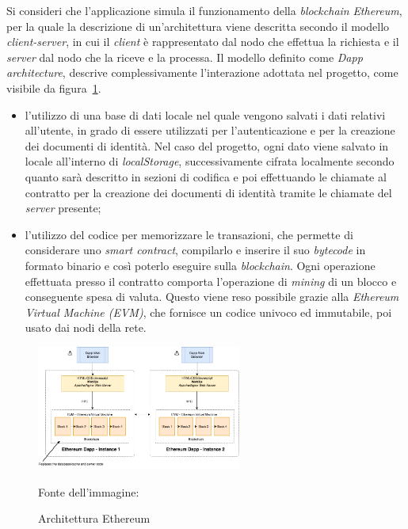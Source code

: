 Si consideri che l'applicazione simula il funzionamento della \textit{blockchain} \textit{Ethereum}, per la quale la descrizione di un'architettura viene
descritta secondo il modello \textit{client-server}, in cui il \textit{client} è rappresentato dal nodo che effettua la richiesta e il \textit{server} dal nodo che la riceve e la processa.
Il modello definito come \textit{Dapp architecture}, descrive complessivamente l'interazione adottata nel progetto, come visibile da figura~\ref{fig:eth-architecture}.
\begin{itemize}
\item l'utilizzo di una base di dati locale nel quale vengono salvati i dati relativi all'utente, in grado di essere utilizzati per l'autenticazione e per la creazione dei documenti di identità.
Nel caso del progetto, ogni dato viene salvato in locale all'interno di \textit{localStorage}, successivamente cifrata localmente secondo quanto sarà descritto in sezioni di codifica e 
poi effettuando le chiamate al contratto per la creazione dei documenti di identità tramite le chiamate del \textit{server} presente;
\item l'utilizzo del codice per memorizzare le transazioni, che permette di considerare uno \textit{smart contract}, compilarlo e inserire il suo \textit{bytecode} in formato binario
e così poterlo eseguire sulla \textit{blockchain}. Ogni operazione effettuata presso il contratto comporta l'operazione di \textit{mining} di un blocco e conseguente spesa di valuta.
Questo viene reso possibile grazie alla \textit{Ethereum Virtual Machine (EVM)}, che fornisce un codice univoco ed immutabile, poi usato dai nodi della rete.
\end{itemize}

\begin{figure}[ht]
    \centering
    \includegraphics[width=0.6\textwidth, alt={Descrizione dell'architettura di Ethereum}]{immagini/ethereum-architecture.png}
    \caption{Architettura Ethereum} Fonte dell'immagine:~\cite{site:etharchitecture}\label{fig:eth-architecture}
\end{figure}

